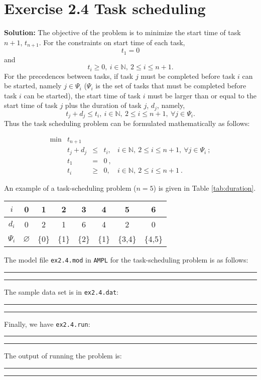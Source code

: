 \section{Exercise 2.4 Task scheduling}
\textbf{Solution:}
The objective of the problem is to minimize the start time of task $n+1$, $t_{n+1}$. For the constraints on start time of each task, $$t_1 = 0$$ and $$t_i \geq 0, ~i \in \mathbb{N}, ~2 \leq i \leq n+1.$$ For the precedences between tasks, if task $j$ must be completed before task $i$ can be started, namely $j \in \Psi_i$ ($\Psi_i$ is the set of tasks that must be completed before task $i$ can be started), the start time of task $i$ must be larger than or equal to the start time of task $j$ plus the duration of task $j$, $d_j$, namely, $$t_j + d_j \leq t_i,~i \in \mathbb{N}, ~2 \leq i \leq n+1,~\forall j \in \Psi_i.$$ Thus the task scheduling problem can be formulated mathematically as follows:

\[
\begin{array}{rrcll}
 \min & t_{n+1}  &  &   & \\
      &  t_j + d_j  &   \leq  & t_i, &i \in \mathbb{N}, ~2 \leq i \leq n+1,~\forall j \in \Psi_i~; \\
      &  t_1 & = & 0~, & \\
      &  t_i & \geq & 0, & i \in \mathbb{N}, ~2 \leq i \leq n+1~.
\end{array}
\]

An example of a task-scheduling problem ($n=5$) is given in Table \ref{tab:duration}.

\begin{table*}[!h]
\centering
\small
\begin{tabular}{|c|c|c|c|c|c|c|c|}\hline

$i$ & 0 & 1 & 2 & 3 & 4 & 5 & 6  \\\hline
$d_i$ & 0 & 2 & 1 & 6 & 4 & 2 & 0 \\\hline
$\Psi_i$ & $\varnothing$ & \{0\} & \{1\} & \{2\} & \{1\} & \{3,4\} & \{4,5\} \\\hline
\end{tabular}
\caption{Duration of each task, and precedences between tasks}
\label{tab:duration}
\end{table*}

The model file {\tt ex2.4.mod} in {\tt AMPL} for the task-scheduling problem is as follows:

\bigskip
\hrule
\small

\normalsize
\hrule
\bigskip

The sample data set is in {\tt ex2.4.dat}:

\bigskip
\hrule
\small

\normalsize
\hrule
\bigskip

Finally, we have {\tt ex2.4.run}:

\bigskip
\hrule
\small

\normalsize
\hrule
\bigskip

The output of running the problem is:

\bigskip
\hrule
\small

\normalsize
\hrule
\bigskip

